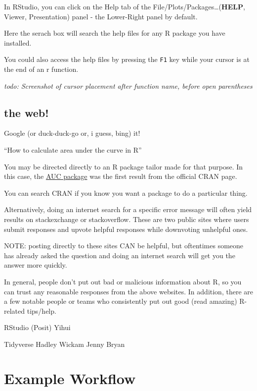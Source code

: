 \documentclass[
]{book}
\begin{document}
In RStudio, you can click on the Help tab of the File/Plots/Packages\ldots(\textbf{HELP}, Viewer, Presentation) panel - the Lower-Right panel by default.

Here the serach box will search the help files for any R package you have installed.

You could also access the help files by pressing the \texttt{F1} key while your cursor is at the end of an r function.

\emph{todo: Screenshot of cursor placement after function name, before open parentheses}

\hypertarget{the-web}{%
\subsection{the web!}\label{the-web}}

Google (or duck-duck-go or, i guess, bing) it!

``How to calculate area under the curve in R''

You may be directed directly to an R package tailor made for that purpose. In this case, the \href{https://search.r-project.org/CRAN/refmans/DescTools/html/AUC.html}{AUC package} was the first result from the official CRAN page.

You can search CRAN if you know you want a package to do a particular thing.

Alternatively, doing an internet search for a specific error message will often yield results on stackexchange or stackoverflow. These are two public sites where users submit responses and upvote helpful responses while downvoting unhelpful ones.

NOTE: posting directly to these sites CAN be helpful, but oftentimes someone has already asked the question and doing an internet search will get you the answer more quickly.

In general, people don't put out bad or malicious information about R, so you can trust any reasonable responses from the above websites. In addition, there are a few notable people or teams who consistently put out good (read amazing) R-related tips/help.

RStudio (Posit)
Yihui

Tidyverse
Hadley Wickam
Jenny Bryan

\hypertarget{example-workflow}{%
\section*{Example Workflow}\label{example-workflow}}
\end{document}
